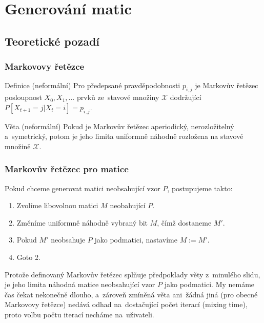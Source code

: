 \documentclass{beamer}
\begin{document}
\section{Generování matic}
\subsection{Teoretické pozadí}
\begin{frame}
\frametitle{Markovovy řetězce}
\begin{block}{Definice (neformální)}
Pro předepsané pravděpodobnosti $p_{i,j}$ je \alert{Markovův řetězec} posloupnost $X_0,X_1,\dots$ prvků ze~stavové množiny $\mathcal{X}$ dodržující $P[X_{t+1}=j|X_t=i]=p_{i,j}.$
\end{block}
\pause
\begin{block}{Věta (neformální)}
Pokud je Markovův řetězec aperiodický, nerozložitelný a~symetrický, potom je jeho limita uniformně náhodně rozložena na stavové množině $\mathcal{X}$.
\end{block}
\end{frame}

\begin{frame}
\frametitle{Markovův řetězec pro matice}
Pokud chceme generovat matici neobsahující vzor $P$, postupujeme takto:
\begin{enumerate}
\item Zvolíme libovolnou matici $M$ neobahující $P$.
\item Změníme uniformně náhodně vybraný bit $M$, čímž dostaneme $M'$.
\item \alert{Pokud $M'$ neobsahuje $P$ jako podmatici}, nastavíme $M:=M'$.
\item Goto 2.
\end{enumerate}
\vspace{1em}
\pause
Protože definovaný Markovův řetězec splňuje předpoklady věty z~minulého slidu, je jeho limita náhodná matice neobsahující vzor $P$ jako podmatici. My nemáme čas čekat nekonečně dlouho, a~zároveň zmíněná věta ani~žádná jiná (pro obecné Markovovy řetězce) nedává odhad na~dostačující počet iterací (mixing time), proto volbu počtu iterací necháme na~uživateli.
\end{frame}
\end{document}
